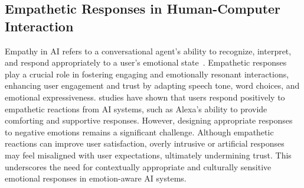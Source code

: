 \subsection{Empathetic Responses in Human-Computer Interaction}
Empathy in AI refers to a conversational agent's ability to recognize, interpret, and respond appropriately to a user’s emotional state~\cite{srinivasan2022role}. Empathetic responses play a crucial role in fostering engaging and emotionally resonant interactions\cite{raamkumar2022empathetic,liu2022artificial}, enhancing user engagement and trust by adapting speech tone, word choices, and emotional expressiveness\cite{barange2022impact}.
studies have shown that users respond positively to empathetic reactions from AI systems, such as Alexa’s ability to provide comforting and supportive responses\cite{carolus2021alexa,mari2024empathic}. However, designing appropriate responses to negative emotions remains a significant challenge. Although empathetic reactions can improve user satisfaction, overly intrusive or artificial responses may feel misaligned with user expectations, ultimately undermining trust\cite{atta2024influence,berking2012emotion}. This underscores the need for contextually appropriate and culturally sensitive emotional responses in emotion-aware AI systems.

